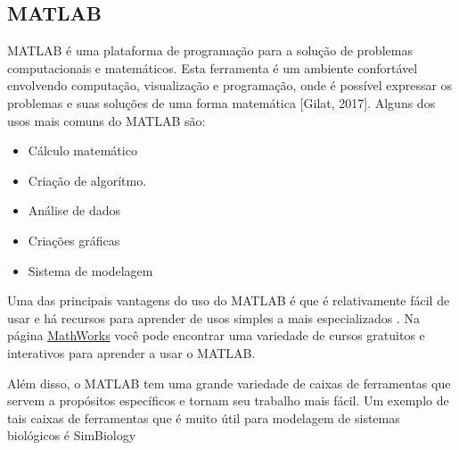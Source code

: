 \documentclass[11pt, letterpaper, portuguese]{article}
\begin{document}
    \subsection{MATLAB}
    \par{MATLAB é uma plataforma de programação para a solução de problemas computacionais e matemáticos. Esta ferramenta é um ambiente confortável envolvendo computação, visualização e programação, onde é possível expressar os problemas e suas soluções de uma forma matemática [Gilat, 2017]. Alguns dos usos mais comuns do MATLAB são:}
    \begin{itemize}
        \item Cálculo matemático
        \item Criação de algorítmo.
        \item Análise de dados
        \item Criações gráficas
        \item Sistema de modelagem
    \end{itemize} 
    \par{Uma das principais vantagens do uso do MATLAB é que é relativamente fácil de usar e há recursos para aprender de usos simples a mais especializados \cite{Kirouac2019}. Na página \href{https://la.mteensrks.com/support/learn-with-matlab-tutorials,.html}{MathWorks}  você pode encontrar uma variedade de cursos gratuitos e interativos para aprender a usar o MATLAB.}
    \par{Além disso, o MATLAB tem uma grande variedade de caixas de ferramentas que servem a propósitos específicos e tornam seu trabalho mais fácil. Um exemplo de tais caixas de ferramentas que é muito útil para modelagem de sistemas biológicos é SimBiology \cite{Park2019}}
\end{document}
